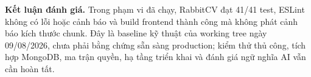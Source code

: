 \noindent\textbf{Kết luận đánh giá.}
Trong phạm vi đã chạy, RabbitCV đạt 41/41 test, ESLint không có lỗi hoặc cảnh báo và build frontend thành công mà không phát cảnh báo kích thước chunk. Đây là baseline kỹ thuật của working tree ngày 09/08/2026, chưa phải bằng chứng sẵn sàng production; kiểm thử thủ công, tích hợp MongoDB, ma trận quyền, hạ tầng triển khai và đánh giá ngữ nghĩa AI vẫn cần hoàn tất.
